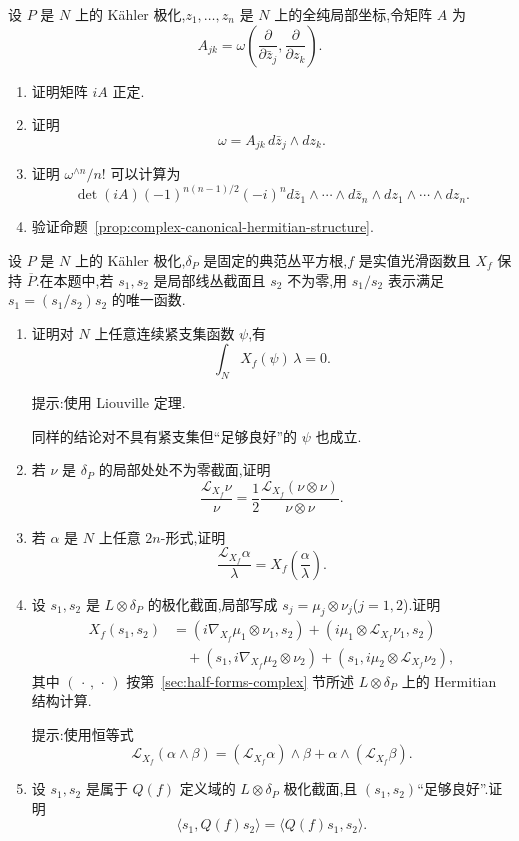 {\begin{exercise}\label{ex:complex-canonical-hermitian-calculation}
设 $P$ 是 $N$ 上的 Kähler 极化,$z_1,\ldots,z_n$ 是 $N$ 上的全纯局部坐标,令矩阵 $A$ 为
\[
 A_{jk}=\omega\left(\frac{\partial}{\partial\bar z_j},\frac{\partial}{\partial z_k}\right).
\]
\begin{enumerate}
\item 证明矩阵 $iA$ 正定.
\item 证明
\[
 \omega=A_{jk}\,d\bar z_j\wedge dz_k.
\]
\item 证明 $\omega^{\wedge n}/n!$ 可以计算为
\[
 \det(iA)(-1)^{n(n-1)/2}(-i)^n
 d\bar z_1\wedge\cdots\wedge d\bar z_n\wedge dz_1\wedge\cdots\wedge dz_n.
\]
\item 验证命题~\ref{prop:complex-canonical-hermitian-structure}.
\end{enumerate}
\end{exercise}

\begin{exercise}[复情形的半形式对称性]\label{ex:complex-half-form-symmetric}
设 $P$ 是 $N$ 上的 Kähler 极化,$\delta_P$ 是固定的典范丛平方根,$f$ 是实值光滑函数且 $X_f$ 保持 $\overline P$.在本题中,若 $s_1,s_2$ 是局部线丛截面且 $s_2$ 不为零,用 $s_1/s_2$ 表示满足 $s_1=(s_1/s_2)s_2$ 的唯一函数.
\begin{enumerate}
\item 证明对 $N$ 上任意连续紧支集函数 $\psi$,有
\[
 \int_N X_f(\psi)\,\lambda=0.
\]

提示:使用 Liouville 定理.

\begin{note}
同样的结论对不具有紧支集但“足够良好”的 $\psi$ 也成立.
\end{note}

\item 若 $\nu$ 是 $\delta_P$ 的局部处处不为零截面,证明
\[
 \frac{\mathcal L_{X_f}\nu}{\nu}
 =\frac12\frac{\mathcal L_{X_f}(\nu\otimes\nu)}{\nu\otimes\nu}.
\]
\item 若 $\alpha$ 是 $N$ 上任意 $2n$-形式,证明
\[
 \frac{\mathcal L_{X_f}\alpha}{\lambda}
 =X_f\left(\frac{\alpha}{\lambda}\right).
\]
\item 设 $s_1,s_2$ 是 $L\otimes\delta_P$ 的极化截面,局部写成 $s_j=\mu_j\otimes\nu_j$($j=1,2$).证明
\[
\begin{aligned}
 X_f(s_1,s_2)
 &= (i\nabla_{X_f}\mu_1\otimes\nu_1,s_2)
 +(i\mu_1\otimes\mathcal L_{X_f}\nu_1,s_2)\\
 &\quad +(s_1,i\nabla_{X_f}\mu_2\otimes\nu_2)
 +(s_1,i\mu_2\otimes\mathcal L_{X_f}\nu_2),
\end{aligned}
\]
其中 $(\,\cdot\,,\,\cdot\,)$ 按第~\ref{sec:half-forms-complex} 节所述 $L\otimes\delta_P$ 上的 Hermitian 结构计算.

提示:使用恒等式
\[
 \mathcal L_{X_f}(\alpha\wedge\beta)
 =(\mathcal L_{X_f}\alpha)\wedge\beta
 +\alpha\wedge(\mathcal L_{X_f}\beta).
\]
\item 设 $s_1,s_2$ 是属于 $Q(f)$ 定义域的 $L\otimes\delta_P$ 极化截面,且 $(s_1,s_2)$“足够良好”.证明
\[
 \langle s_1,Q(f)s_2\rangle
 =\langle Q(f)s_1,s_2\rangle.
\]
\end{enumerate}
\end{exercise}

}%

